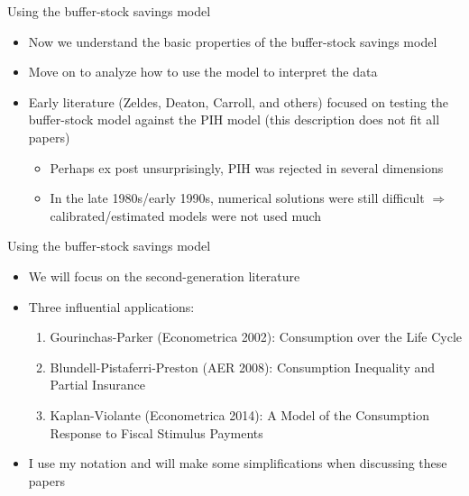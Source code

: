 \documentclass[9pt]{beamer}
\newcommand{\bit}{\begin{itemize}}
\newcommand{\eit}{\end{itemize}}
\newcommand{\ben}{\begin{enumerate}}
\newcommand{\een}{\end{enumerate}}
\begin{document}
\begin{frame}{Using the buffer-stock savings model}

\bit
\setlength\itemsep{1.5em}
\item Now we understand the basic properties of the buffer-stock savings model

\item Move on to analyze how to use the model to interpret the data

\item Early literature (Zeldes, Deaton, Carroll, and others) focused on testing the buffer-stock model against the PIH model (this description does not fit all papers)
\bit
\setlength\itemsep{0.5em}
	\item Perhaps ex post unsurprisingly, PIH was rejected in several dimensions
	
	\item In the late 1980s/early 1990s, numerical solutions were still difficult $\Rightarrow$ calibrated/estimated models were not used much
\eit

\eit

\end{frame}

\begin{frame}{Using the buffer-stock savings model}

\bit
\setlength\itemsep{1.5em}

\item We will focus on the second-generation literature

\item Three influential applications:
\ben
\setlength\itemsep{0.5em}
	\item Gourinchas-Parker (Econometrica 2002): Consumption over the Life Cycle
	
	\item Blundell-Pistaferri-Preston (AER 2008): Consumption Inequality and Partial Insurance
	
	\item Kaplan-Violante (Econometrica 2014): A Model of the Consumption Response to Fiscal Stimulus Payments
\een

\item I use my notation and will make some simplifications when discussing these papers


\eit

\end{frame}
\end{document}

